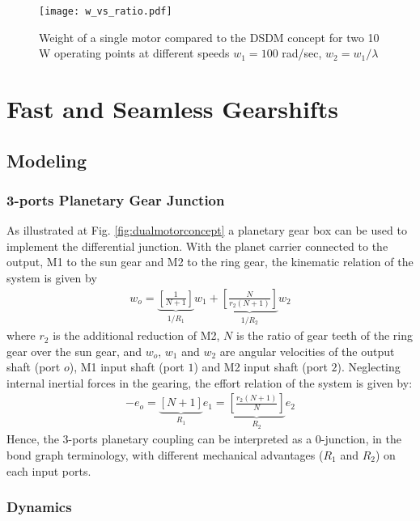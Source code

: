 \begin{figure}[H]
	\centering
		\texttt{[image: w\_vs\_ratio.pdf]}
	\caption{Weight of a single motor compared to the DSDM concept for two 10 W operating points at different speeds $w_1=100$ rad/sec, $w_2 = w_1 / \lambda$}
	\label{fig:1vs2}
\end{figure}


\section{Fast and Seamless Gearshifts}
\label{sec:FastAndSeamlessGearshifts}

\subsection{Modeling}


\subsubsection{3-ports Planetary Gear Junction}
As illustrated at Fig. \ref{fig:dualmotorconcept} a planetary gear box can be used to implement the differential junction. With the planet carrier connected to the output, M1 to the sun gear and M2 to the ring gear, the kinematic relation of the system is given by
%
\begin{align}
	w_o = 
	\underbrace{ \left[ 
	\frac{ 1 }{N+1}
	\right] }_{  1/R_1  }
	w_1 + 
	\underbrace{ \left[ 
	\frac{ N  }{r_2 (N+1)}
	\right] }_{  1/R_2  }
	w_2
\label{eq:kinematic}
\end{align}
%
where $r_2$ is the additional reduction of M2, $N$ is the ratio of gear teeth of the ring gear over the sun gear, and $w_o$, $w_1$ and $w_2$ are angular velocities of the output shaft (port $o$), M1 input shaft (port $1$) and M2 input shaft (port $2$). Neglecting internal inertial forces in the gearing, the effort relation of the system is given by:
%
\begin{align}
	- e_o =
	\underbrace{ \left[ 
	N+1
	\right] }_{ R_1  }
	e_1 = 
	\underbrace{ \left[ 
	\frac{r_2(N+1)}{N}
	\right] }_{ R_2  }
	e_2
	\label{eq:torque}
\end{align}
%
Hence, the 3-ports planetary coupling can be interpreted as a 0-junction, in the bond graph terminology, with different mechanical advantages ($R_1$ and $R_2$) on each input ports. 

\subsubsection{Dynamics}
\label{sec:dyn}



